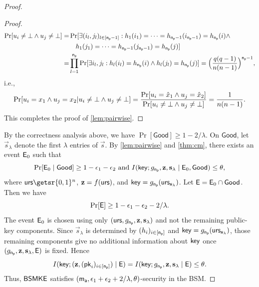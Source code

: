 \begin{proof}
\begin{proof}
\[\begin{split}
\Pr[ u_i\neq\bot\land  u_j\neq \bot]
=&\Pr[\exists (i_l,j_l)_{l\in[\mathsf{n_p}-1]}: h_1(i_1)=\cdots= h_{\mathsf{n_p}-1}(i_{\mathsf{n_p}-1})= h_{\mathsf{n_p}}(i)\land\\
&\hspace*{1em}  h_1(j_1)=\cdots= h_{\mathsf{n_p}-1}(j_{\mathsf{n_p}-1})= h_{\mathsf{n_p}}(j)]
\\
=&\prod_{l=1}^{\mathsf{n_p}}\Pr[\exists i_l,j_l: h_l(i_l)=h_{\mathsf{n_p}}(i)\land  h_l(j_l)= h_{\mathsf{n_p}}(j)]
=\Big(\frac{q(q-1)}{n(n-1)}\Big)^{\mathsf{n_p}-1},
\end{split}\]
i.e.,
$$
 \Pr[ u_i=x_1\land  u_j=x_2| u_i\neq \bot\land  u_j\neq\bot]=\frac{\Pr[ u_i=\hat{x}_1\land  u_j=\hat{x}_2]}{\Pr[ u_i\neq\bot\land  u_j\neq \bot]}=\frac{1}{n(n-1)}.
$$
This completes the proof of \cref{lem:pairwise}.
\end{proof}

By the correctness analysis above, we have
$\Pr[\mathsf{Good}]\geq 1-2/\lambda$. On $\mathsf{Good}$, let
$\vec{s}_{\lambda}$ denote the first $\lambda$ entries of $\vec s$. By
\cref{lem:pairwise} and \cref{thm:cm}, there exists an
event $\mathsf{E}_0$ such that
\[
\Pr[\mathsf{E}_0\mid\mathsf{Good}]\geq 1-\epsilon_1-\epsilon_2
\
\mbox{and}
\
I(\mathsf{key};g_{\mathsf{n_p}},\mathbf{z},\mathbf{s}_{\lambda}\mid\mathsf{E}_0,\mathsf{Good})
\leq \theta,
\]
where $\urs\getsr\bin^n$, $\mathbf{z}=f(\mathsf{urs})$, and
$\mathsf{key}=g_{\mathsf{n_p}}(\mathsf{urs}_{\mathbf{s}_{\lambda}})$.
Let $\mathsf{E}=\mathsf{E}_0\cap\mathsf{Good}$. Then we have
\[
\Pr[\mathsf{E}]\geq 1-\epsilon_1-\epsilon_2-2/\lambda.
\]
The event $\mathsf{E}_0$ is chosen using only $(\mathsf{urs},g_{\mathsf{n_p}},\mathbf{z},\mathbf{s}_\lambda)$ and not the remaining public-key components. Since $\vec{s}_{\lambda}$ is determined by $(h_i)_{i\in[\mathsf{n_p}]}$ and $\mathsf{key}=g_{\mathsf{n_p}}(\mathsf{urs}_{\mathbf{s}_{\lambda}})$, those remaining components give no additional information about $\mathsf{key}$ once $(g_{\mathsf{n_p}},\mathbf{z},\mathbf{s}_{\lambda},\mathsf{E})$ is fixed. Hence
\[
I(\mathsf{key};(\mathbf{z},(\mathsf{pk}_i)_{i\in[\mathsf{n_p}]})\mid\mathsf{E})
=
I(\mathsf{key};g_{\mathsf{n_p}},\mathbf{z},\mathbf{s}_{\lambda}\mid\mathsf{E})
\leq
\theta.
\]
Thus, ${\mathsf{BSMKE}}$ satisfies $(\mathsf{m_a},\epsilon_1+\epsilon_2+2/\lambda,\theta)$-security in the BSM.


\end{proof}
